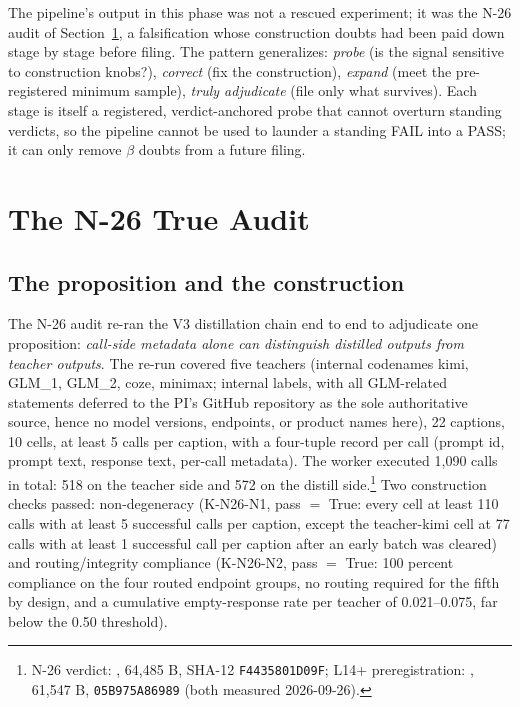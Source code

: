 \documentclass[11pt]{article}
\newcommand{\sha}[1]{\texttt{#1}}
\begin{document}
The pipeline's output in this phase was not a rescued experiment; it was the N-26 audit of Section~\ref{sec:n26}, a falsification whose construction doubts had been paid down stage by stage before filing. The pattern generalizes: \emph{probe} (is the signal sensitive to construction knobs?), \emph{correct} (fix the construction), \emph{expand} (meet the pre-registered minimum sample), \emph{truly adjudicate} (file only what survives). Each stage is itself a registered, verdict-anchored probe that cannot overturn standing verdicts, so the pipeline cannot be used to launder a standing FAIL into a PASS; it can only remove $\beta$ doubts from a future filing.

\section{The N-26 True Audit}\label{sec:n26}

\subsection{The proposition and the construction}

The N-26 audit re-ran the V3 distillation chain end to end to adjudicate one proposition: \emph{call-side metadata alone can distinguish distilled outputs from teacher outputs}. The re-run covered five teachers (internal codenames kimi, GLM\_1, GLM\_2, coze, minimax; internal labels, with all GLM-related statements deferred to the PI's GitHub repository as the sole authoritative source, hence no model versions, endpoints, or product names here), 22 captions, 10 cells, at least 5 calls per caption, with a four-tuple record per call (prompt id, prompt text, response text, per-call metadata). The worker executed 1{,}090 calls in total: 518 on the teacher side and 572 on the distill side.\footnote{N-26 verdict: , 64{,}485 B, SHA-12 \sha{F4435801D09F}; L14+ preregistration: , 61{,}547 B, \sha{05B975A86989} (both measured 2026-09-26).} Two construction checks passed: non-degeneracy (K-N26-N1, pass $=$ True: every cell at least 110 calls with at least 5 successful calls per caption, except the teacher-kimi cell at 77 calls with at least 1 successful call per caption after an early batch was cleared) and routing/integrity compliance (K-N26-N2, pass $=$ True: 100 percent compliance on the four routed endpoint groups, no routing required for the fifth by design, and a cumulative empty-response rate per teacher of 0.021--0.075, far below the 0.50 threshold).
\end{document}
